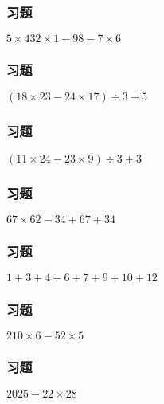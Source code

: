 \begin{frame}
    \frametitle{习题\theframecounter}
    \vspace*{-3cm}
    \centering\textit{\Large $5\times 432\times 1 - 98 - 7\times 6$}
\end{frame}

\begin{frame}
    \frametitle{习题\theframecounter}
    \vspace*{-3cm}
    \centering\textit{\Large $(18\times 23 - 24\times 17)\div 3 + 5$}
\end{frame}


\begin{frame}
    \frametitle{习题\theframecounter}
    \vspace*{-3cm}   
    \centering\textit{\Large $(11\times 24 - 23\times 9)\div 3 + 3$}
\end{frame}



\begin{frame}
    \frametitle{习题\theframecounter} 
    \vspace*{-3cm}   
    \centering\textit{\Large $67\times 62 - 34 + 67 + 34$}
\end{frame}

\begin{frame}
    \frametitle{习题\theframecounter} 
    \vspace*{-3cm}   
    \centering\textit{\Large $1+3+4+6+7+9+10 + 12$}
\end{frame}


\begin{frame}
    \frametitle{习题\theframecounter}
    \vspace*{-3cm}
    \centering\textit{\Large $210\times 6 - 52\times 5$}
\end{frame}


\begin{frame}
    \frametitle{习题\theframecounter}
    \vspace*{-3cm}
    \centering\textit{\Large $2025- 22\times 28$}
\end{frame}
